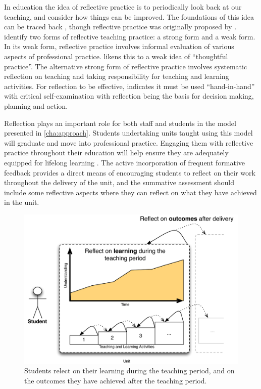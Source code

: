 In education the idea of reflective practice is to periodically look back at our teaching, and consider how things can be improved. The foundations of this idea can be traced back \citet{Dewey:1933}, though reflective practice was originally proposed by \citet{Schon:1983}. \citet{Farrell:2007,Farrell:2008} identify two forms of reflective teaching practice: a strong form and a weak form. In its weak form, reflective practice involves informal evaluation of various aspects of professional practice. \citet{Farrell:2008} likens this to a weak idea of ``thoughtful practice''. The alternative strong form of reflective practice involves systematic reflection on teaching and taking responsibility for teaching and learning activities. For reflection to be effective, \citet{Richards:1994} indicates it must be used ``hand-in-hand'' with critical self-examination with reflection being the basis for decision making, planning and action.

Reflection plays an important role for both staff and students in the model presented in \cref{cha:approach}. Students undertaking units taught using this model will graduate and move into professional practice. Engaging them with reflective practice throughout their education will help ensure they are adequately equipped for lifelong learning \cite{Field:2006}. The active incorporation of frequent formative feedback provides a direct means of encouraging students to reflect on their work throughout the delivery of the unit, and the summative assessment should include some reflective aspects where they can reflect on what they have achieved in the unit.

\begin{figure}[ptbh]
	\centering
	\includegraphics[width=\textwidth]{StudentReflection}
	\caption{Students relect on their learning during the teaching period, and on the outcomes they have achieved after the teaching period.}
	\label{fig:student_reflection}
\end{figure}

